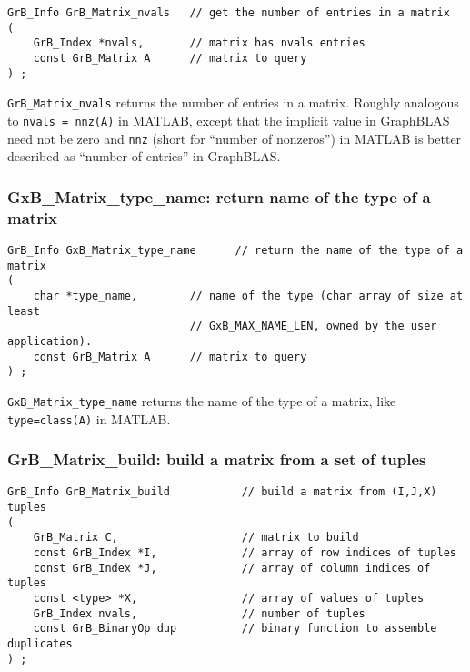 \documentclass[12pt]{article}
\begin{document}
\begin{mdframed}[userdefinedwidth=6in]
{\footnotesize
\begin{verbatim}
GrB_Info GrB_Matrix_nvals   // get the number of entries in a matrix
(
    GrB_Index *nvals,       // matrix has nvals entries
    const GrB_Matrix A      // matrix to query
) ;
\end{verbatim} } \end{mdframed}

\verb'GrB_Matrix_nvals' returns the number of entries in a matrix.  Roughly
analogous to \verb'nvals = nnz(A)' in MATLAB, except that the implicit value in
GraphBLAS need not be zero and \verb'nnz' (short for ``number of nonzeros'') in
MATLAB is better described as ``number of entries'' in GraphBLAS.

\newpage
\subsubsection{{\sf GxB\_Matrix\_type\_name:} return name of the type of a matrix}
\label{matrix_type_name}

\begin{mdframed}[userdefinedwidth=6in]
{\footnotesize
\begin{verbatim}
GrB_Info GxB_Matrix_type_name      // return the name of the type of a matrix
(
    char *type_name,        // name of the type (char array of size at least
                            // GxB_MAX_NAME_LEN, owned by the user application).
    const GrB_Matrix A      // matrix to query
) ;
\end{verbatim} } \end{mdframed}

\verb'GxB_Matrix_type_name' returns the name of the type of a matrix, like
\verb'type=class(A)' in MATLAB.

\subsubsection{{\sf GrB\_Matrix\_build:} build a matrix from a set of tuples}
\label{matrix_build}

\begin{mdframed}[userdefinedwidth=6in]
{\footnotesize
\begin{verbatim}
GrB_Info GrB_Matrix_build           // build a matrix from (I,J,X) tuples
(
    GrB_Matrix C,                   // matrix to build
    const GrB_Index *I,             // array of row indices of tuples
    const GrB_Index *J,             // array of column indices of tuples
    const <type> *X,                // array of values of tuples
    GrB_Index nvals,                // number of tuples
    const GrB_BinaryOp dup          // binary function to assemble duplicates
) ;
\end{verbatim} } \end{mdframed}
\end{document}
